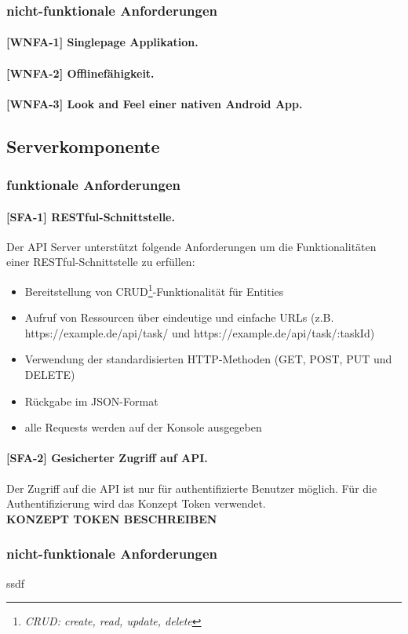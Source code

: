 \newpage
\subsubsection{nicht-funktionale Anforderungen}

\paragraph{[WNFA-1] Singlepage Applikation.}

\paragraph{[WNFA-2] Offlinefähigkeit.}

\paragraph{[WNFA-3] Look and Feel einer nativen Android App.}\label{par_wnfa3}


\newpage
\subsection{Serverkomponente}

\subsubsection{funktionale Anforderungen}

\paragraph{[SFA-1] RESTful-Schnittstelle. }Der API Server unterstützt folgende Anforderungen um die Funktionalitäten einer RESTful-Schnittstelle zu erfüllen:

\begin{itemize}  
\item Bereitstellung von CRUD\footnote{\textit{CRUD: create, read, update, delete}}-Funktionalität für Entities
\item Aufruf von Ressourcen über eindeutige und einfache URLs (z.B. https://example.de/api/task/ und https://example.de/api/task/:taskId) 
\item Verwendung der standardisierten HTTP-Methoden (GET, POST, PUT und DELETE) 
\item Rückgabe im JSON-Format
\item alle Requests werden auf der Konsole ausgegeben
\end{itemize}


\paragraph{[SFA-2] Gesicherter Zugriff auf API.} Der Zugriff auf die API ist nur für authentifizierte Benutzer möglich. Für die Authentifizierung wird das Konzept Token verwendet. \\
\textbf{KONZEPT TOKEN BESCHREIBEN}


\subsubsection{nicht-funktionale Anforderungen}
ssdf


